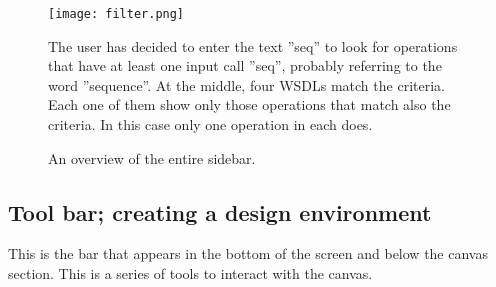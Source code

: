 \documentclass[a4paper,10pt]{article}
\begin{document}
    \begin{figure}[H]
      {\centering  
      \texttt{[image: filter.png]}
      \caption{An overview of the entire sidebar.}}
      \medskip
      \small
      The user has decided to enter the text ''seq'' to look for operations that have at least one input call ''seq'', probably referring to the word ''sequence''. At the middle, four WSDLs match the criteria. Each one of them show only those operations that match also the criteria. In this case only one operation in each does.
    \end{figure}

  \subsection{Tool bar; creating a design environment}

    This is the bar that appears in the bottom of the screen and below the canvas section. This is a series of tools to interact with the canvas.
\end{document}
